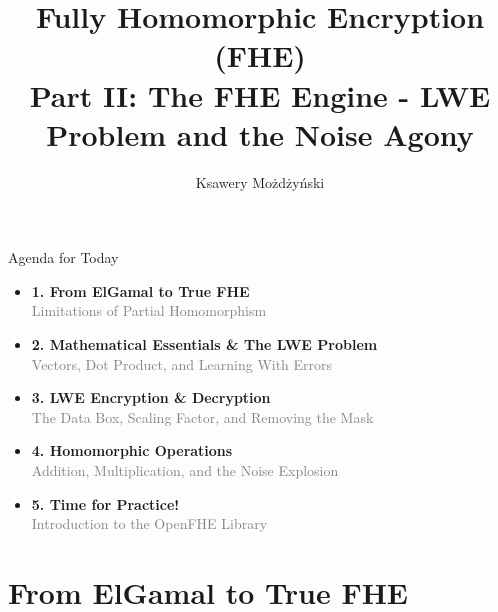 \documentclass[aspectratio=169, 10pt]{beamer}
\title[FHE - Part II]{\textbf{Fully Homomorphic Encryption (FHE)}\\ \Large Part II: The FHE Engine - LWE Problem and the Noise Agony}
\author{Ksawery Możdżyński}
\date{}
\begin{document}
\begin{frame} 
    \titlepage 
\end{frame}

\begin{frame}{Agenda for Today} 
    \Large 
\begin{itemize}
    \setlength{\itemsep}{0.06cm} %
    
    \item[\textcolor{AccentOrange}{\faHistory}] \textbf{1. From ElGamal to True FHE} \\
    \textcolor{gray}{\footnotesize Limitations of Partial Homomorphism}

    \item[\textcolor{AccentOrange}{\faCalculator}] \textbf{2. Mathematical Essentials \& The LWE Problem} \\
    \textcolor{gray}{\footnotesize Vectors, Dot Product, and Learning With Errors}

    \item[\textcolor{AccentOrange}{\faLock}] \textbf{3. LWE Encryption \& Decryption} \\
    \textcolor{gray}{\footnotesize The Data Box, Scaling Factor, and Removing the Mask}

    \item[\textcolor{AccentOrange}{\faCloud}] \textbf{4. Homomorphic Operations} \\
    \textcolor{gray}{\footnotesize Addition, Multiplication, and the Noise Explosion}

    \item[\textcolor{AccentOrange}{\faCode}] \textbf{5. Time for Practice!} \\
    \textcolor{gray}{\footnotesize Introduction to the OpenFHE Library}
\end{itemize}
\end{frame}

\section{From ElGamal to True FHE}
\end{document}
